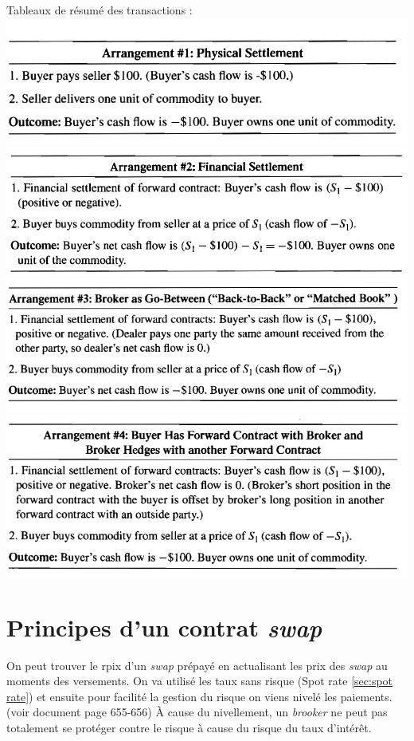 \documentclass[11pt,french]{report}
\begin{document}
Tableaux de résumé des transactions :
\\
\includegraphics[scale=0.45]{picture39.PNG}
\\
\includegraphics[scale=0.45]{picture40.PNG} 
\\
\includegraphics[scale=0.45]{picture41.PNG}
\\
\includegraphics[scale=0.45]{picture42.PNG}

\section{Principes d'un contrat \emph{swap}}
\label{sec:swap principe}

On peut trouver le rpix d'un \emph{swap} prépayé en actualisant les prix des \emph{swap} au moments des versements. On va utilisé les taux sans risque (Spot rate \ref{sec:spot rate}) et ensuite pour facilité la gestion du risque on viens nivelé les paiements. (voir document page 655-656) À cause du nivellement, un \emph{brooker} ne peut pas totalement se protéger contre le risque à cause du risque du taux d'intérêt.
\end{document}
